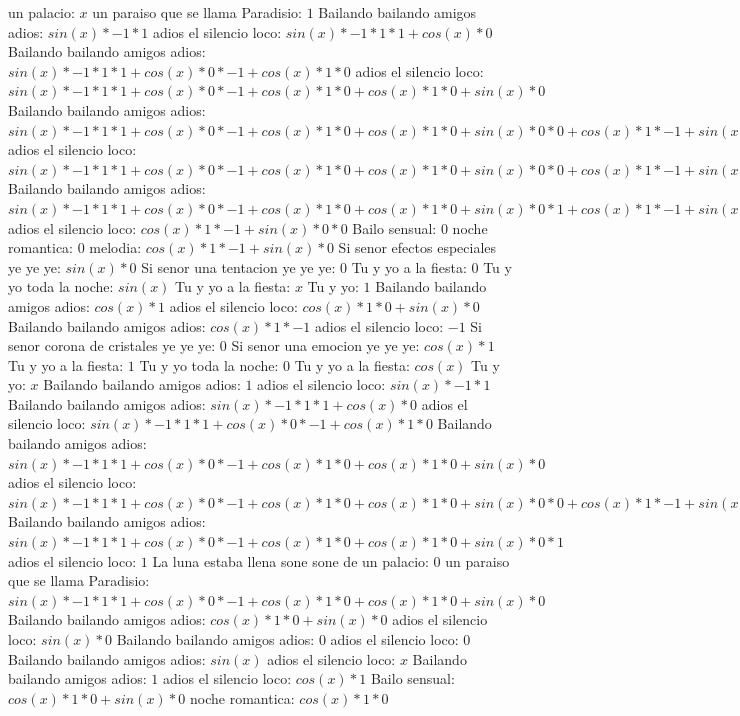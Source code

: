 \documentclass{article}
\begin{document}
un palacio: $x$ un paraiso que se llama Paradisio: $1$  \newline Bailando bailando amigos adios: $sin(x)*-1*1$ adios el silencio loco: $sin(x)*-1*1*1+cos(x)*0$ Bailando bailando amigos adios: ${sin(x)*-1*1*1+cos(x)*0}*-1+cos(x)*1*0$ adios el silencio loco: ${sin(x)*-1*1*1+cos(x)*0}*-1+cos(x)*1*0+cos(x)*1*0+sin(x)*0$ Bailando bailando amigos adios: ${{sin(x)*-1*1*1+cos(x)*0}*-1+cos(x)*1*0+cos(x)*1*0+sin(x)*0}*0+{cos(x)*1*-1+sin(x)*0}*0$ adios el silencio loco: ${{sin(x)*-1*1*1+cos(x)*0}*-1+cos(x)*1*0+cos(x)*1*0+sin(x)*0}*0+{cos(x)*1*-1+sin(x)*0}*0+{cos(x)*1*-1+sin(x)*0}*0+sin(x)*-1*0$ Bailando bailando amigos adios: ${{sin(x)*-1*1*1+cos(x)*0}*-1+cos(x)*1*0+cos(x)*1*0+sin(x)*0}*1+{cos(x)*1*-1+sin(x)*0}*0$  \newline adios el silencio loco: ${cos(x)*1*-1+sin(x)*0}*0$ Bailo sensual: $0$ noche romantica: $0$  \newline melodia: $cos(x)*1*-1+sin(x)*0$  \newline Si senor efectos especiales ye ye ye: $sin(x)*0$ Si senor una tentacion ye ye ye: $0$ Tu y yo a la fiesta: $0$  \newline Tu y yo toda la noche: $sin(x)$  \newline Tu y yo a la fiesta: $x$ Tu y yo: $1$  \newline Bailando bailando amigos adios: $cos(x)*1$ adios el silencio loco: $cos(x)*1*0+sin(x)*0$ Bailando bailando amigos adios: $cos(x)*1*-1$ adios el silencio loco: $-1$ Si senor corona de cristales ye ye ye: $0$  \newline Si senor una emocion ye ye ye: $cos(x)*1$ Tu y yo a la fiesta: $1$ Tu y yo toda la noche: $0$  \newline Tu y yo a la fiesta: $cos(x)$  \newline Tu y yo: $x$ Bailando bailando amigos adios: $1$  \newline adios el silencio loco: $sin(x)*-1*1$ Bailando bailando amigos adios: $sin(x)*-1*1*1+cos(x)*0$ adios el silencio loco: ${sin(x)*-1*1*1+cos(x)*0}*-1+cos(x)*1*0$ Bailando bailando amigos adios: ${sin(x)*-1*1*1+cos(x)*0}*-1+cos(x)*1*0+cos(x)*1*0+sin(x)*0$ adios el silencio loco: ${{sin(x)*-1*1*1+cos(x)*0}*-1+cos(x)*1*0+cos(x)*1*0+sin(x)*0}*0+{cos(x)*1*-1+sin(x)*0}*0$ Bailando bailando amigos adios: ${{sin(x)*-1*1*1+cos(x)*0}*-1+cos(x)*1*0+cos(x)*1*0+sin(x)*0}*1$ adios el silencio loco: $1$ La luna estaba llena sone sone de un palacio: $0$  \newline un paraiso que se llama Paradisio: ${sin(x)*-1*1*1+cos(x)*0}*-1+cos(x)*1*0+cos(x)*1*0+sin(x)*0$  \newline Bailando bailando amigos adios: $cos(x)*1*0+sin(x)*0$  \newline adios el silencio loco: $sin(x)*0$ Bailando bailando amigos adios: $0$ adios el silencio loco: $0$  \newline Bailando bailando amigos adios: $sin(x)$  \newline adios el silencio loco: $x$ Bailando bailando amigos adios: $1$  \newline adios el silencio loco: $cos(x)*1$ Bailo sensual: $cos(x)*1*0+sin(x)*0$ noche romantica: $cos(x)*1*0$ 
\end{document}
